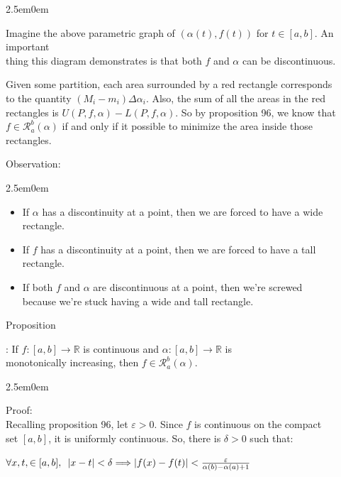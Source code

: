 \documentclass{book}
\newcommand{\hTwo}{%
   \color{MidnightBlue}%
   \fontsize{13}{15}\selectfont%
}
\newcommand{\hThree}{%
   \color{PineGreen!85!Orange}
   \fontsize{13}{15}\selectfont%
}
\newcommand{\exOne}{%
   \color{Purple}%
   \fontsize{14}{16}\selectfont%
}
\newcommand{\exTwo}{%
   \color{RedViolet}%
   \fontsize{13}{15}\selectfont%
}
\newenvironment{myIndent}{%
   \begin{adjustwidth}{2.5em}{0em}%
}{%
   \end{adjustwidth}%
}
\newcommand{\myHS}{ \hspace{0.5em}}
\newcounter{PropNumber}
\newcommand{\propCount}[1][1]{%
   \addtocounter{PropNumber}{#1}%
   \thePropNumber%
}
\newcommand{\retTwo}{\hfill\bigbreak}
\begin{document}
{\begin{myIndent}\exOne
   Imagine the above parametric graph of $(\alpha(t), f(t))$ for $t \in [a, b]$. An important\\ thing this diagram demonstrates is that both $f$ and $\alpha$ can be discontinuous.\retTwo

   Given some partition, each area surrounded by a red rectangle corresponds\\ to the quantity $(M_i - m_i)\Delta \alpha_i$. Also, the sum of all the areas in the red\\ rectangles is $U(P, f, \alpha) - L(P, f, \alpha)$. So by proposition 96, we know that\\ $f \in \mathscr{R}_a^b(\alpha)$ if and only if it possible to minimize the area inside those\\ rectangles.

   \newpage

   Observation:
   \begin{myIndent}\exTwo
      \begin{itemize}
         \item If $\alpha$ has a discontinuity at a point, then we are forced to have a wide\\ rectangle.
         \item If $f$ has a discontinuity at a point, then we are forced to have a tall\\ rectangle.
         \item If both $f$ and $\alpha$ are discontinuous at a point, then we're screwed\\ because we're stuck having a wide and tall rectangle.\retTwo\retTwo
      \end{itemize}
   \end{myIndent}

   \hTwo
   Proposition \propCount: If $f: [a, b] \longrightarrow \mathbb{R}$ is continuous and $\alpha: [a, b] \longrightarrow \mathbb{R}$ is\\ monotonically increasing, then $f \in \mathscr{R}_a^b(\alpha)$.
   
   {\begin{myIndent}\hThree
      Proof:\\
      Recalling proposition 96, let $\varepsilon > 0$. Since $f$ is continuous on the compact\\ set $[a, b]$, it is uniformly continuous. So, there is $\delta > 0$ such that:
      
      {\centering $\forall x, t, \in [a, b],\myHS |x-t|<\delta \Longrightarrow |f(x) - f(t)| < \frac{\varepsilon}{\alpha(b) - \alpha(a) + 1}$\\ [4pt]\par}


\end{myIndent}}
\end{myIndent}}
\end{document}
